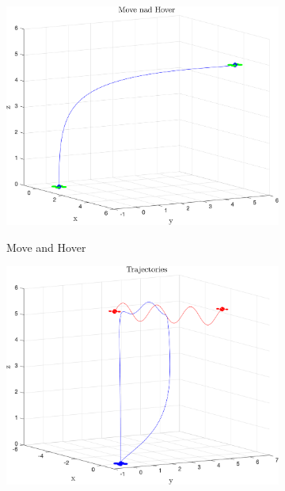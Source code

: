 \documentclass{article}
\begin{document}
\begin{multicols}{2}
\begin{figure}[H]
\centering
\begin{subfigure}[b]{0.49\columnwidth}
    \centering
    \includegraphics[width = 1\textwidth]{images/MoveAndHover.png}
     \label{fig:MandH}
     \vspace{-5mm}
     \caption{Move and Hover}
\end{subfigure}
\begin{subfigure}[b]{0.49\columnwidth}
    \centering
    \includegraphics[width = 1\textwidth]{images/ReturnToBase.png}
     \label{fig:Return}
     \vspace{-5mm}

\end{subfigure}
\end{figure}
\end{multicols}
\end{document}
